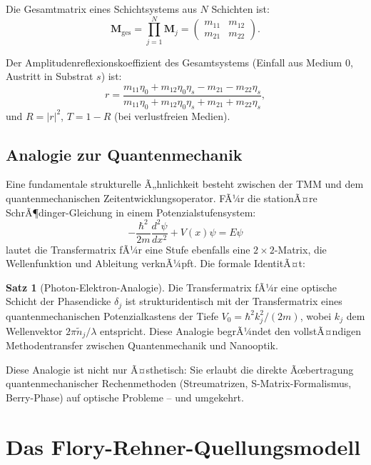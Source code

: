 ﻿\documentclass[a4paper,12pt]{scrreprt}
\theoremstyle{definition}
\newtheorem{satz}{Satz}[section]
\newcommand{\matr}[1]{\mathbf{#1}}
\begin{document}
Die Gesamtmatrix eines Schichtsystems aus $N$ Schichten ist:
\begin{equation}
  \matr{M}_{\mathrm{ges}} = \prod_{j=1}^{N} \matr{M}_j =
  \begin{pmatrix} m_{11} & m_{12} \\ m_{21} & m_{22} \end{pmatrix}.
\end{equation}

Der Amplitudenreflexionskoeffizient des Gesamtsystems (Einfall aus Medium 0,
Austritt in Substrat $s$) ist:
\begin{equation}
  r = \frac{m_{11}\eta_0 + m_{12}\eta_0\eta_s - m_{21} - m_{22}\eta_s}
  {m_{11}\eta_0 + m_{12}\eta_0\eta_s + m_{21} + m_{22}\eta_s},
\end{equation}
und $R = |r|^2$, $T = 1 - R$ (bei verlustfreien Medien).

\subsection{Analogie zur Quantenmechanik}

Eine fundamentale strukturelle Ã„hnlichkeit besteht zwischen der TMM und dem
quantenmechanischen Zeitentwicklungsoperator. FÃ¼r die stationÃ¤re
SchrÃ¶dinger-Gleichung in einem Potenzialstufensystem:
\begin{equation}
  -\frac{\hbar^2}{2m}\frac{d^2\psi}{dx^2} + V(x)\psi = E\psi
\end{equation}
lautet die Transfermatrix fÃ¼r eine Stufe ebenfalls eine $2\times 2$-Matrix,
die Wellenfunktion und Ableitung verknÃ¼pft. Die formale IdentitÃ¤t:

\begin{satz}[Photon-Elektron-Analogie]
  Die Transfermatrix fÃ¼r eine optische Schicht der Phasendicke $\delta_j$ ist
  strukturidentisch mit der Transfermatrix eines quantenmechanischen
  Potenzialkastens der Tiefe $V_0 = \hbar^2 k_j^2/(2m)$, wobei $k_j$ dem
  Wellenvektor $2\pi \tilde{n}_j/\lambda$ entspricht. Diese Analogie begrÃ¼ndet
  den vollstÃ¤ndigen Methodentransfer zwischen Quantenmechanik und Nanooptik.
\end{satz}

Diese Analogie ist nicht nur Ã¤sthetisch: Sie erlaubt die direkte Ãœbertragung
quantenmechanischer Rechenmethoden (Streumatrizen, S-Matrix-Formalismus,
Berry-Phase) auf optische Probleme -- und umgekehrt.

\section{Das Flory-Rehner-Quellungsmodell}
\end{document}
